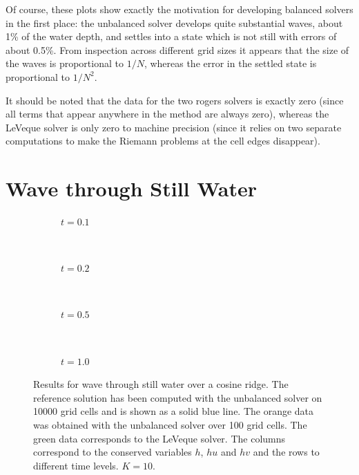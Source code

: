 Of course, these plots show exactly the motivation for developing balanced solvers in the first place: the unbalanced solver develops quite substantial waves, about 1\% of the water depth, and settles into a state which is not still with errors of about 0.5\%. From inspection across different grid sizes it appears that the size of the waves is proportional to $1/N$, whereas the error in the settled state is proportional to $1/N^2$.

It should be noted that the data for the two rogers solvers is exactly zero (since all terms that appear anywhere in the method are always zero), whereas the LeVeque solver is only zero to machine precision (since it relies on two separate computations to make the Riemann problems at the cell edges disappear).

\section{Wave through Still Water}

\begin{figure}
  \centering
  \begin{subfigure}{\textwidth}
    \caption{$t = 0.1$}
    \label{fig:results-wave-lev-1}
  \end{subfigure} \\
  \begin{subfigure}{\textwidth}
    \caption{$t = 0.2$}
    \label{fig:results-wave-lev-2}
  \end{subfigure} \\
  \begin{subfigure}{\textwidth}
    \caption{$t = 0.5$}
    \label{fig:results-wave-lev-5}
  \end{subfigure} \\
  \begin{subfigure}{\textwidth}
    \caption{$t = 1.0$}
    \label{fig:results-wave-lev-10}
  \end{subfigure}
  \caption{Results for wave through still water over a cosine ridge. The reference solution has been computed with the unbalanced solver on 10000 grid cells and is shown as a solid blue line. The orange data was obtained with the unbalanced solver over 100 grid cells. The green data corresponds to the LeVeque solver. The columns correspond to the conserved variables $h$, $hu$ and $hv$ and the rows to different time levels. $K = 10$.}
  \label{fig:results-wave-lev}
\end{figure}

